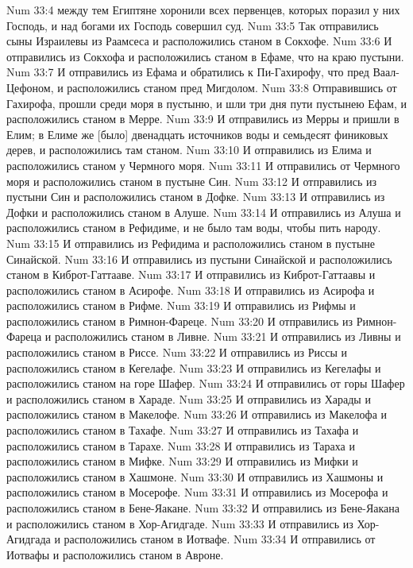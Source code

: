 \vs Num 33:4 между тем Египтяне хоронили всех первенцев, которых поразил у них Господь, и над богами их Господь совершил суд.
\vs Num 33:5 Так отправились сыны Израилевы из Раамсеса и расположились станом в Сокхофе.
\vs Num 33:6 И отправились из Сокхофа и расположились станом в Ефаме, что на краю пустыни.
\vs Num 33:7 И отправились из Ефама и обратились к Пи-Гахирофу, что пред Ваал-Цефоном, и расположились станом пред Мигдолом.
\vs Num 33:8 Отправившись от Гахирофа, прошли среди моря в пустыню, и шли три дня пути пустынею Ефам, и расположились станом в Мерре.
\vs Num 33:9 И отправились из Мерры и пришли в Елим; в Елиме же [было] двенадцать источников воды и семьдесят финиковых дерев, и расположились там станом.
\vs Num 33:10 И отправились из Елима и расположились станом у Чермного моря.
\vs Num 33:11 И отправились от Чермного моря и расположились станом в пустыне Син.
\vs Num 33:12 И отправились из пустыни Син и расположились станом в Дофке.
\vs Num 33:13 И отправились из Дофки и расположились станом в Алуше.
\vs Num 33:14 И отправились из Алуша и расположились станом в Рефидиме, и не было там воды, чтобы пить народу.
\vs Num 33:15 И отправились из Рефидима и расположились станом в пустыне Синайской.
\vs Num 33:16 И отправились из пустыни Синайской и расположились станом в Киброт-Гаттааве.
\vs Num 33:17 И отправились из Киброт-Гаттаавы и расположились станом в Асирофе.
\vs Num 33:18 И отправились из Асирофа и расположились станом в Рифме.
\vs Num 33:19 И отправились из Рифмы и расположились станом в Римнон-Фареце.
\vs Num 33:20 И отправились из Римнон-Фареца и расположились станом в Ливне.
\vs Num 33:21 И отправились из Ливны и расположились станом в Риссе.
\vs Num 33:22 И отправились из Риссы и расположились станом в Кегелафе.
\vs Num 33:23 И отправились из Кегелафы и расположились станом на горе Шафер.
\vs Num 33:24 И отправились от горы Шафер и расположились станом в Хараде.
\vs Num 33:25 И отправились из Харады и расположились станом в Макелофе.
\vs Num 33:26 И отправились из Макелофа и расположились станом в Тахафе.
\vs Num 33:27 И отправились из Тахафа и расположились станом в Тарахе.
\vs Num 33:28 И отправились из Тараха и расположились станом в Мифке.
\vs Num 33:29 И отправились из Мифки и расположились станом в Хашмоне.
\vs Num 33:30 И отправились из Хашмоны и расположились станом в Мосерофе.
\vs Num 33:31 И отправились из Мосерофа и расположились станом в Бене-Яакане.
\vs Num 33:32 И отправились из Бене-Яакана и расположились станом в Хор-Агидгаде.
\vs Num 33:33 И отправились из Хор-Агидгада и расположились станом в Иотвафе.
\vs Num 33:34 И отправились от Иотвафы и расположились станом в Авроне.
